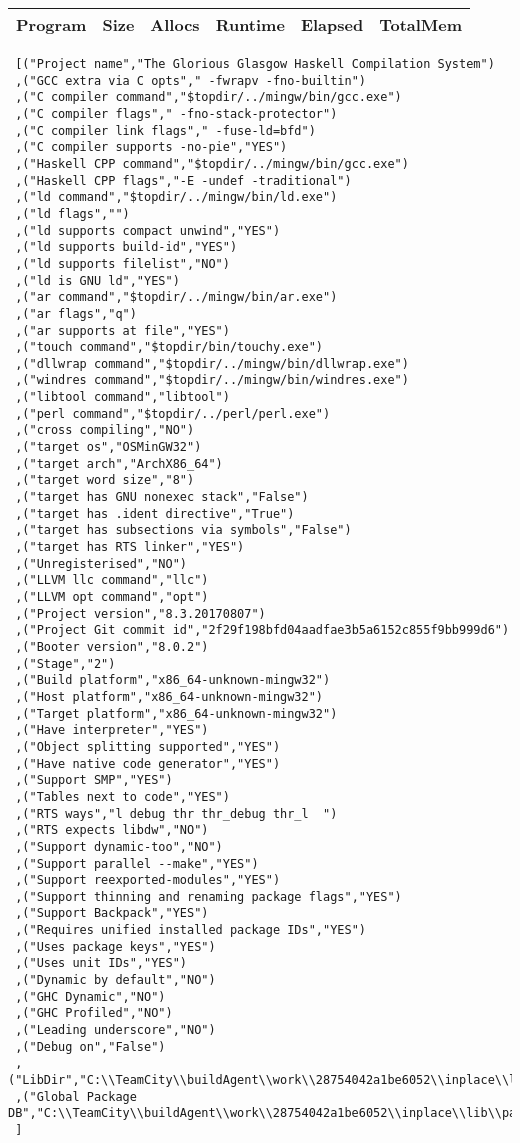\begin{tabular}{ c c c c c c }
Program & Size & Allocs & Runtime & Elapsed & TotalMem\\
\hline
\end{tabular}
\begin{verbatim}
 [("Project name","The Glorious Glasgow Haskell Compilation System")
 ,("GCC extra via C opts"," -fwrapv -fno-builtin")
 ,("C compiler command","$topdir/../mingw/bin/gcc.exe")
 ,("C compiler flags"," -fno-stack-protector")
 ,("C compiler link flags"," -fuse-ld=bfd")
 ,("C compiler supports -no-pie","YES")
 ,("Haskell CPP command","$topdir/../mingw/bin/gcc.exe")
 ,("Haskell CPP flags","-E -undef -traditional")
 ,("ld command","$topdir/../mingw/bin/ld.exe")
 ,("ld flags","")
 ,("ld supports compact unwind","YES")
 ,("ld supports build-id","YES")
 ,("ld supports filelist","NO")
 ,("ld is GNU ld","YES")
 ,("ar command","$topdir/../mingw/bin/ar.exe")
 ,("ar flags","q")
 ,("ar supports at file","YES")
 ,("touch command","$topdir/bin/touchy.exe")
 ,("dllwrap command","$topdir/../mingw/bin/dllwrap.exe")
 ,("windres command","$topdir/../mingw/bin/windres.exe")
 ,("libtool command","libtool")
 ,("perl command","$topdir/../perl/perl.exe")
 ,("cross compiling","NO")
 ,("target os","OSMinGW32")
 ,("target arch","ArchX86_64")
 ,("target word size","8")
 ,("target has GNU nonexec stack","False")
 ,("target has .ident directive","True")
 ,("target has subsections via symbols","False")
 ,("target has RTS linker","YES")
 ,("Unregisterised","NO")
 ,("LLVM llc command","llc")
 ,("LLVM opt command","opt")
 ,("Project version","8.3.20170807")
 ,("Project Git commit id","2f29f198bfd04aadfae3b5a6152c855f9bb999d6")
 ,("Booter version","8.0.2")
 ,("Stage","2")
 ,("Build platform","x86_64-unknown-mingw32")
 ,("Host platform","x86_64-unknown-mingw32")
 ,("Target platform","x86_64-unknown-mingw32")
 ,("Have interpreter","YES")
 ,("Object splitting supported","YES")
 ,("Have native code generator","YES")
 ,("Support SMP","YES")
 ,("Tables next to code","YES")
 ,("RTS ways","l debug thr thr_debug thr_l  ")
 ,("RTS expects libdw","NO")
 ,("Support dynamic-too","NO")
 ,("Support parallel --make","YES")
 ,("Support reexported-modules","YES")
 ,("Support thinning and renaming package flags","YES")
 ,("Support Backpack","YES")
 ,("Requires unified installed package IDs","YES")
 ,("Uses package keys","YES")
 ,("Uses unit IDs","YES")
 ,("Dynamic by default","NO")
 ,("GHC Dynamic","NO")
 ,("GHC Profiled","NO")
 ,("Leading underscore","NO")
 ,("Debug on","False")
 ,("LibDir","C:\\TeamCity\\buildAgent\\work\\28754042a1be6052\\inplace\\lib")
 ,("Global Package DB","C:\\TeamCity\\buildAgent\\work\\28754042a1be6052\\inplace\\lib\\package.conf.d")
 ]
\end{verbatim}
